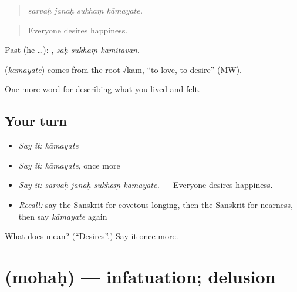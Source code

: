 \begin{quote}
   
\end{quote}

\begin{quote}
\emph{sarvaḥ janaḥ sukhaṃ kāmayate.}
\end{quote}

\begin{quote}
Everyone desires happiness.
\end{quote}

Past (he …):   , \emph{saḥ sukhaṃ kāmitavān}.

\begin{cousinweb}
\textbf{} (\emph{kāmayate}) comes from the root √kam, \textquotedblleft{}to love, to desire\textquotedblright{} (MW).
\end{cousinweb}

\begin{grammarlens}[title={What you've built}]
One more word for describing what you lived and felt.
\end{grammarlens}

\subsection*{Your turn}
\begin{itemize}
\raggedright
  \item \emph{Say it:} \emph{kāmayate}
  \item \emph{Say it:} \emph{kāmayate}, once more
  \item \emph{Say it:} \emph{sarvaḥ janaḥ sukhaṃ kāmayate.} — Everyone desires happiness.
  \item \emph{Recall:} say the Sanskrit for covetous longing, then the Sanskrit for nearness, then say \emph{kāmayate} again
\end{itemize}

\begin{tcolorbox}[breakable,colback=teal!4,colframe=teal!35!black,title={Before you move on}]
What does  mean? (\textquotedblleft{}Desires\textquotedblright{}.) Say it once more.
\end{tcolorbox}
\section[\texorpdfstring{\sk{मोहः} (mohaḥ)}{मोहः (mohaḥ)}]{ (mohaḥ) — infatuation; delusion}

\label{lesson:SA-C455-mohah}



